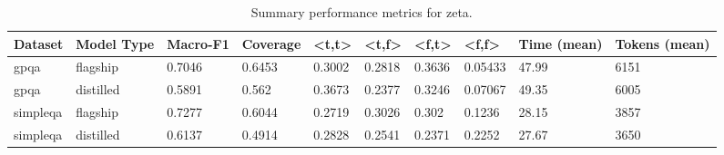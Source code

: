 \begin{table}[htbp]
\caption{Summary performance metrics for zeta.}
\label{tab:summaryperf}
\begin{tabular}{llllllllll}
\toprule
Dataset & Model Type & Macro-F1 & Coverage & <t,t> & <t,f> & <f,t> & <f,f> & Time (mean) & Tokens (mean) \\
\midrule
gpqa & flagship & 0.7046 & 0.6453 & 0.3002 & 0.2818 & 0.3636 & 0.05433 & 47.99 & 6151 \\
gpqa & distilled & 0.5891 & 0.562 & 0.3673 & 0.2377 & 0.3246 & 0.07067 & 49.35 & 6005 \\
simpleqa & flagship & 0.7277 & 0.6044 & 0.2719 & 0.3026 & 0.302 & 0.1236 & 28.15 & 3857 \\
simpleqa & distilled & 0.6137 & 0.4914 & 0.2828 & 0.2541 & 0.2371 & 0.2252 & 27.67 & 3650 \\
\bottomrule
\end{tabular}
\end{table}


